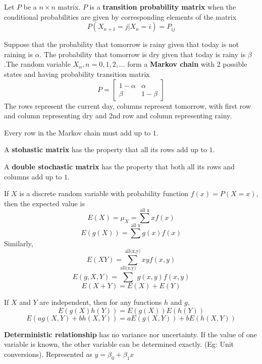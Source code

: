 \documentclass[english, 12pt]{article}
\begin{document}

\begin{defn}
Let $P$ be a $n \times n$ matrix. $P$ is a \textbf{transition probability matrix} when the conditional probabilities are given by corresponding elements of the matrix
\[P(X_{n+1} = j | X_{n} = i) = P_{ij}\]
\end{defn}

\begin{exmp}
Suppose that the probability that tomorrow is rainy given that today is not raining is $\alpha$. The probability that tomorrow is dry given that today is rainy is $\beta$.The random variable $X_{n}, n = 0,1,2,\dots$ form a \textbf{Markov chain} with 2 possible states and having probability transition matrix
\[P=\begin{bmatrix} 1 - \alpha & \alpha \\ \beta & 1 - \beta \end{bmatrix}\]
The rows represent the current day, columns represent tomorrow, with first row and column representing dry and 2nd row and column representing rainy.
\end{exmp}

\begin{qte}
Every row in the Markov chain must add up to $1$.
\end{qte}

\begin{defn}
A \textbf{stohastic matrix} has the property that all its rows add up to $1$.
\end{defn}

\begin{defn}
A \textbf{double stochastic matrix} has the property that both all its rows and columns add up to $1$.
\end{defn}
\begin{defn}
If $X$ is a discrete random variable with probability function $f(x) = P(X = x)$, then the expected value is
\[E(X) = \mu_X = \sum^{\text{all x}} x f(x)\]
\[E(g(X)) = \sum^{\text{all x}} g(x) f(x)\]
Similarly,
\[E(XY) = \sum^{\text{all(x,y)}} xy f(x,y)\]
\[E(g,X,Y) = \sum^{\text{all(x,y)}} g(x,y) f(x,y)\]
\[E(X+Y) = E(X) + E(Y)\]
\end{defn}

If $X$ and $Y$ are independent, then for any functions $h$ and $g$,
\[E(g(X) h(Y)) = E(g(X)) E(h(Y))\]
\[E(ag(X,Y) + b h(X,Y)) = a E(g(X,Y)) + b E(h(X,Y))\]

\begin{defn}
\textbf{Deterministic relationship} has no variance nor uncertainty. If the value of one variable is known, the other variable can be determined exactly. (Eg: Unit conversions). Represented as $y = \beta_0 + \beta_{1} x$
\end{defn}
\end{document}
